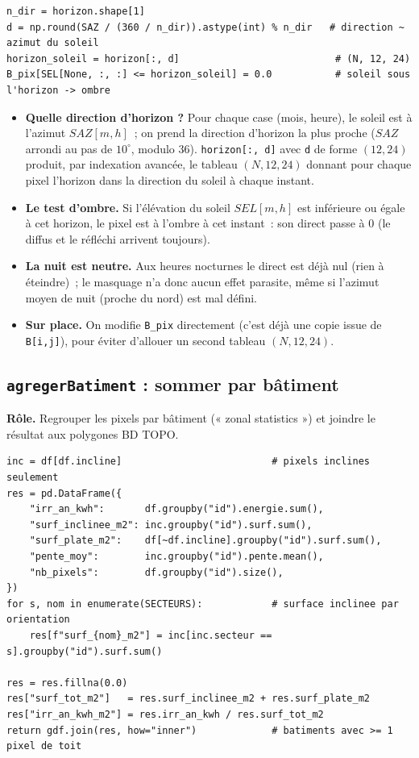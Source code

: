 \documentclass[11pt,a4paper]{article}
\newcommand{\fonction}[1]{\texttt{#1}}
\begin{document}
\begin{lstlisting}
n_dir = horizon.shape[1]
d = np.round(SAZ / (360 / n_dir)).astype(int) % n_dir   # direction ~ azimut du soleil
horizon_soleil = horizon[:, d]                           # (N, 12, 24)
B_pix[SEL[None, :, :] <= horizon_soleil] = 0.0           # soleil sous l'horizon -> ombre
\end{lstlisting}

\begin{itemize}
  \item \textbf{Quelle direction d'horizon ?} Pour chaque case (mois, heure), le
    soleil est à l'azimut $SAZ[m,h]$~; on prend la direction d'horizon la plus
    proche ($SAZ$ arrondi au pas de $10^\circ$, modulo 36). \fonction{horizon[:,
    d]} avec \fonction{d} de forme $(12,24)$ produit, par indexation avancée, le
    tableau $(N,12,24)$ donnant pour chaque pixel l'horizon dans la direction du
    soleil à chaque instant.
  \item \textbf{Le test d'ombre.} Si l'élévation du soleil $SEL[m,h]$ est
    inférieure ou égale à cet horizon, le pixel est à l'ombre à cet instant~: son
    direct passe à $0$ (le diffus et le réfléchi arrivent toujours).
  \item \textbf{La nuit est neutre.} Aux heures nocturnes le direct est déjà nul
    (rien à éteindre)~; le masquage n'a donc aucun effet parasite, même si
    l'azimut moyen de nuit (proche du nord) est mal défini.
  \item \textbf{Sur place.} On modifie \fonction{B\_pix} directement (c'est déjà
    une copie issue de \fonction{B[i,j]}), pour éviter d'allouer un second
    tableau $(N,12,24)$.
\end{itemize}

\subsection{\fonction{agregerBatiment} : sommer par bâtiment}

\textbf{Rôle.} Regrouper les pixels par bâtiment (« zonal statistics ») et
joindre le résultat aux polygones BD TOPO.

\begin{lstlisting}
inc = df[df.incline]                          # pixels inclines seulement
res = pd.DataFrame({
    "irr_an_kwh":       df.groupby("id").energie.sum(),
    "surf_inclinee_m2": inc.groupby("id").surf.sum(),
    "surf_plate_m2":    df[~df.incline].groupby("id").surf.sum(),
    "pente_moy":        inc.groupby("id").pente.mean(),
    "nb_pixels":        df.groupby("id").size(),
})
for s, nom in enumerate(SECTEURS):            # surface inclinee par orientation
    res[f"surf_{nom}_m2"] = inc[inc.secteur == s].groupby("id").surf.sum()

res = res.fillna(0.0)
res["surf_tot_m2"]   = res.surf_inclinee_m2 + res.surf_plate_m2
res["irr_an_kwh_m2"] = res.irr_an_kwh / res.surf_tot_m2
return gdf.join(res, how="inner")             # batiments avec >= 1 pixel de toit
\end{lstlisting}
\end{document}
